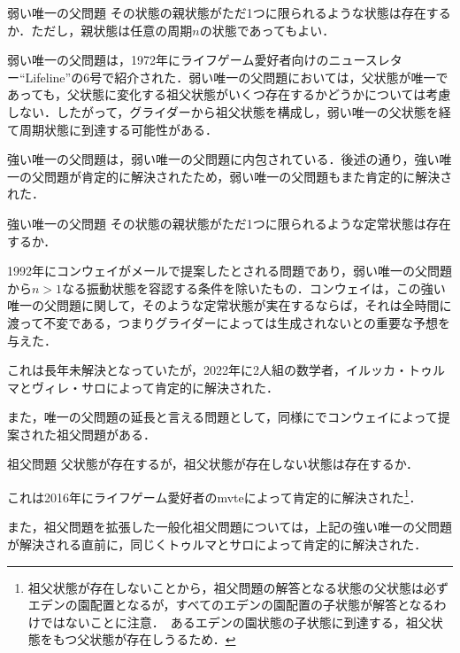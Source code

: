 \documentclass[10pt, a5paper, twoside]{ltjsarticle}
\begin{document}
            \begin{prb}{弱い唯一の父問題}{}
                その状態の親状態がただ1つに限られるような状態は存在するか．ただし，親状態は任意の周期$n$の状態であってもよい．
            \end{prb}

            弱い唯一の父問題は，1972年にライフゲーム愛好者向けのニュースレター``Lifeline''の6号\cite{lifeline}で紹介された．弱い唯一の父問題においては，父状態が唯一であっても，父状態に変化する祖父状態がいくつ存在するかどうかについては考慮しない．したがって，グライダーから祖父状態を構成し，弱い唯一の父状態を経て周期状態に到達する可能性がある．

            強い唯一の父問題は，弱い唯一の父問題に内包されている．後述の通り，強い唯一の父問題が肯定的に解決されたため，弱い唯一の父問題もまた肯定的に解決された．

            \begin{prb}{強い唯一の父問題}{}
                その状態の親状態がただ1つに限られるような定常状態は存在するか．
            \end{prb}

            1992年にコンウェイがメールで提案したとされる問題\cite{apgoucher}であり，弱い唯一の父問題から$n > 1$なる振動状態を容認する条件を除いたもの．コンウェイは，この強い唯一の父問題に関して，そのような定常状態が実在するならば，それは全時間に渡って不変である，つまりグライダーによっては生成されないとの重要な予想を与えた．

            これは長年未解決となっていたが，2022年に2人組の数学者，イルッカ・トゥルマとヴィレ・サロによって肯定的に解決された．

            また，唯一の父問題の延長と言える問題として，同様に\cite{lifeline}でコンウェイによって提案された祖父問題がある．

            \begin{prb}{祖父問題}{}
                父状態が存在するが，祖父状態が存在しない状態は存在するか．
            \end{prb}

            これは2016年にライフゲーム愛好者のmvteによって肯定的に解決された\footnote{祖父状態が存在しないことから，祖父問題の解答となる状態の父状態は必ずエデンの園配置となるが，すべてのエデンの園配置の子状態が解答となるわけではないことに注意．\because \, あるエデンの園状態の子状態に到達する，祖父状態をもつ父状態が存在しうるため．}．

            また，祖父問題を拡張した一般化祖父問題については，上記の強い唯一の父問題が解決される直前に，同じくトゥルマとサロによって肯定的に解決された．
\end{document}
